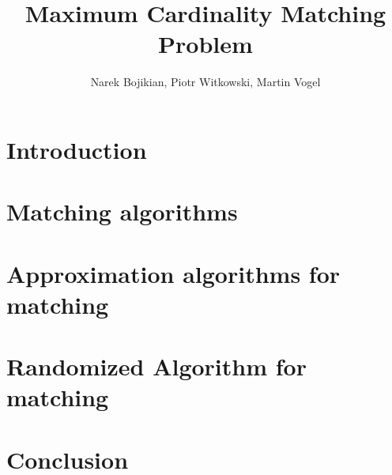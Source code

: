 \documentclass[11pt]{beamer}
\title[Maximum Cardinality Matching]{Maximum Cardinality Matching Problem}
\author [Bojikian, Witkowski, Vogel]{Narek Bojikian, Piotr Witkowski, Martin Vogel}
\begin{document}
\begin{frame}
\titlepage 
\end{frame}

\section{Introduction} 


\section{Matching algorithms} 


\section{Approximation algorithms for matching} 


\section{Randomized Algorithm for matching} 



\section{Conclusion} 

\end{document}
